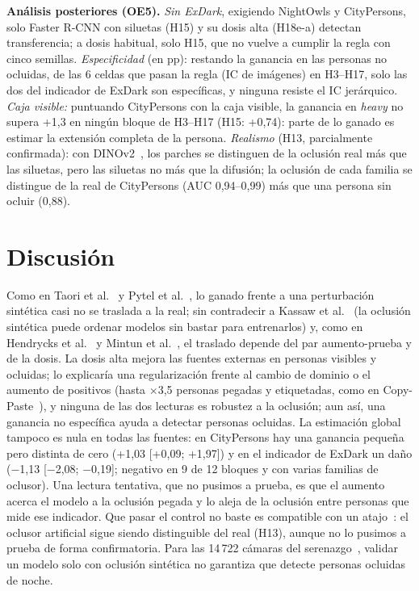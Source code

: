 \documentclass[conference]{IEEEtran}
\begin{document}
\textbf{Análisis posteriores (OE5).} \emph{Sin ExDark}, exigiendo NightOwls y CityPersons, solo Faster R-CNN con siluetas (H15) y su dosis alta (H18e-a) detectan transferencia; a dosis habitual, solo H15, que no vuelve a cumplir la regla con cinco semillas. \emph{Especificidad} (en pp): restando la ganancia en las personas no ocluidas, de las 6 celdas que pasan la regla (IC de imágenes) en H3--H17, solo las dos del indicador de ExDark son específicas, y ninguna resiste el IC jerárquico. \emph{Caja visible:} puntuando CityPersons con la caja visible, la ganancia en \emph{heavy} no supera +1,3 en ningún bloque de H3--H17 (H15: +0,74): parte de lo ganado es estimar la extensión completa de la persona. \emph{Realismo} (H13, parcialmente confirmada): con DINOv2~\cite{Oquab2024dinov2}, los parches se distinguen de la oclusión real más que las siluetas, pero las siluetas no más que la difusión; la oclusión de cada familia se distingue de la real de CityPersons (AUC 0,94--0,99) más que una persona sin ocluir (0,88).

\section{Discusión}
Como en Taori et al.~\cite{Taori2020shifts} y Pytel et al.~\cite{Pytel2021tilting}, lo ganado frente a una perturbación sintética casi no se traslada a la real; sin contradecir a Kassaw et al.~\cite{Kassaw2026occl} (la oclusión sintética puede ordenar modelos sin bastar para entrenarlos) y, como en Hendrycks et al.~\cite{Hendrycks2021manyfaces} y Mintun et al.~\cite{Mintun2021interaction}, el traslado depende del par aumento-prueba y de la dosis. La dosis alta mejora las fuentes externas en personas visibles y ocluidas; lo explicaría una regularización frente al cambio de dominio o el aumento de positivos (hasta $\times$3,5 personas pegadas y etiquetadas, como en Copy-Paste~\cite{Ghiasi2021copypaste}), y ninguna de las dos lecturas es robustez a la oclusión; aun así, una ganancia no específica ayuda a detectar personas ocluidas. La estimación global tampoco es nula en todas las fuentes: en CityPersons hay una ganancia pequeña pero distinta de cero (+1,03 [+0,09; +1,97]) y en el indicador de ExDark un daño ($-$1,13 [$-$2,08; $-$0,19]; negativo en 9 de 12 bloques y con varias familias de oclusor). Una lectura tentativa, que no pusimos a prueba, es que el aumento acerca el modelo a la oclusión pegada y lo aleja de la oclusión entre personas que mide ese indicador. Que pasar el control no baste es compatible con un atajo~\cite{Geirhos2020shortcut}: el oclusor artificial sigue siendo distinguible del real (H13), aunque no lo pusimos a prueba de forma confirmatoria. Para las 14\,722 cámaras del serenazgo~\cite{INEI2024renamu}, validar un modelo solo con oclusión sintética no garantiza que detecte personas ocluidas de noche.
\end{document}

